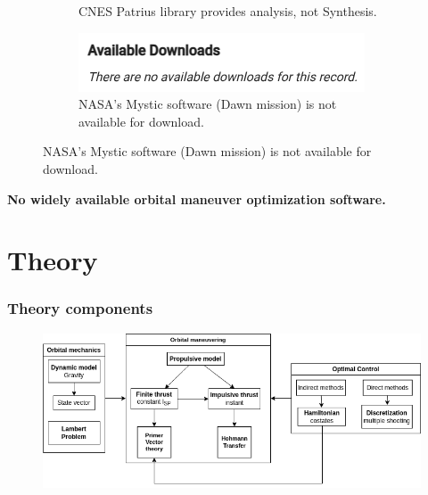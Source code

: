 \documentclass[handout]{beamer}
\begin{document}
\begin{frame}
\begin{figure}[htbp]
\begin{subfigure}{0.25\textwidth}
            \caption{CNES Patrius library provides analysis, not Synthesis.}
        \end{subfigure} \pause
        \begin{subfigure}{0.25\textwidth}
            \centering
            \includegraphics[width=\textwidth]{img/mystic_no_download.png}
            \caption{NASA's Mystic software (Dawn mission) is not available for download.}
        \end{subfigure}
    \end{figure}
    \pause
    \textbf{No widely available orbital maneuver optimization software.}
\end{frame}

\section{Theory}

\begin{frame}
    \frametitle{Theory components}

    \begin{figure}[htbp]
        \centering
        \includegraphics[width=\textwidth]{img/theory_components.png}
    \end{figure}
\end{frame}
\end{document}
